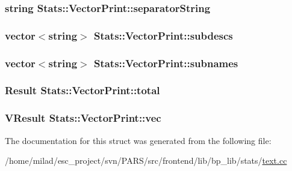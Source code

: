 \label{structStats_1_1VectorPrint_a944b839b2d16ab471f66013d6e543b26}
\hypertarget{structStats_1_1VectorPrint_a61e9ebc60bf9485f5a28c6b7fa0dcb88}{
\subsubsection[{separatorString}]{\setlength{\rightskip}{0pt plus 5cm}string {\bf Stats::VectorPrint::separatorString}}}
\label{structStats_1_1VectorPrint_a61e9ebc60bf9485f5a28c6b7fa0dcb88}
\hypertarget{structStats_1_1VectorPrint_ad41b5952812a233f57034740cd6193e2}{
\subsubsection[{subdescs}]{\setlength{\rightskip}{0pt plus 5cm}vector$<$string$>$ {\bf Stats::VectorPrint::subdescs}}}
\label{structStats_1_1VectorPrint_ad41b5952812a233f57034740cd6193e2}
\hypertarget{structStats_1_1VectorPrint_a584fa8575a02b844676d7dac1f99b8d5}{
\subsubsection[{subnames}]{\setlength{\rightskip}{0pt plus 5cm}vector$<$string$>$ {\bf Stats::VectorPrint::subnames}}}
\label{structStats_1_1VectorPrint_a584fa8575a02b844676d7dac1f99b8d5}
\hypertarget{structStats_1_1VectorPrint_a739c34030fdd6f5dfcc4df58420a4e9f}{
\subsubsection[{total}]{\setlength{\rightskip}{0pt plus 5cm}Result {\bf Stats::VectorPrint::total}}}
\label{structStats_1_1VectorPrint_a739c34030fdd6f5dfcc4df58420a4e9f}
\hypertarget{structStats_1_1VectorPrint_a0c73337c9840ea8e285fd5fbebaf90b1}{
\subsubsection[{vec}]{\setlength{\rightskip}{0pt plus 5cm}VResult {\bf Stats::VectorPrint::vec}}}
\label{structStats_1_1VectorPrint_a0c73337c9840ea8e285fd5fbebaf90b1}


The documentation for this struct was generated from the following file:\begin{DoxyCompactItemize}
\item 
/home/milad/esc\_\-project/svn/PARS/src/frontend/lib/bp\_\-lib/stats/\hyperlink{text_8cc}{text.cc}\end{DoxyCompactItemize}
